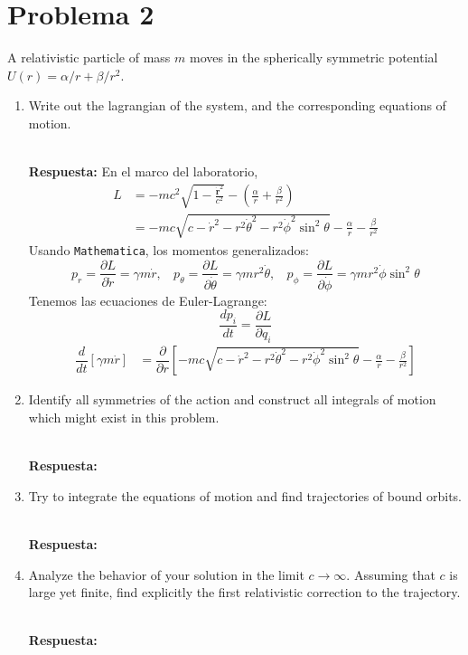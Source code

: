 \documentclass[]{article}
\numberwithin{equation}{section}
\newcommand{\0}{\textcolor{gray}{0}}
\newcommand{\rv}{\mathbf{r}}
\newcommand{\pd}[2]{\dfrac{\partial #1}{\partial #2}}
\newcommand{\td}[2]{\dfrac{d #1}{d #2}}
\newcommand{\resp}{
	\\
	
	\textbf{Respuesta:} }
\begin{document}

\section{Problema 2}
A relativistic particle of mass $m$ moves in the spherically symmetric potential $U (r) = \alpha/r + \beta/r^2$.
\begin{enumerate}
	\item[(a)] Write out the lagrangian of the system, and the corresponding equations of motion.
	\resp En el marco del laboratorio,
	\begin{align}
		L &= -mc^2 \sqrt{1 - \frac{\dot{\rv}^2}{c^2}} - \left(\frac{\alpha}{r} + \frac{\beta}{r^2}\right) \nonumber \\
		&= -mc \sqrt{c - \dot{r}^2 - r^2 \dot{\theta}^2 - r^2\dot{\phi}^2 \sin^2 \theta} - \frac{\alpha}{r} - \frac{\beta}{r^2}
	\end{align}
	Usando \texttt{Mathematica}, los momentos generalizados:
	\begin{equation*}
		p_r = \pd{L}{\dot{r}} = \gamma m \dot{r}, ~~~~ p_\theta = \pd{L}{\dot{\theta}} = \gamma m r^2 \dot{\theta}, ~~~~ p_\phi = \pd{L}{\dot{\phi}} = \gamma m r^2 \dot{\phi} \sin^2\theta
	\end{equation*}
	Tenemos las ecuaciones de Euler-Lagrange:
	\begin{equation*}
		\td{p_i}{t} = \pd{L}{q_i}
	\end{equation*}
	\begin{align*}
		\td{}{t} \left[\gamma m \dot{r}\right] &= \pd{}{r} \left[-mc \sqrt{c - \dot{r}^2 - r^2 \dot{\theta}^2 - r^2\dot{\phi}^2 \sin^2 \theta} - \frac{\alpha}{r} - \frac{\beta}{r^2}\right]
	\end{align*}
	
	\item[(b)] Identify all symmetries of the action and construct all integrals of motion which might exist in this problem.
	\resp
	
	\item[(c)] Try to integrate the equations of motion and find trajectories of bound orbits.
	\resp
	
	\item[(d)] Analyze the behavior of your solution in the limit $c\rightarrow\infty$. Assuming that $c$ is large yet finite, find explicitly the first relativistic correction to the trajectory.
	\resp
	
\end{enumerate}
\end{document}
